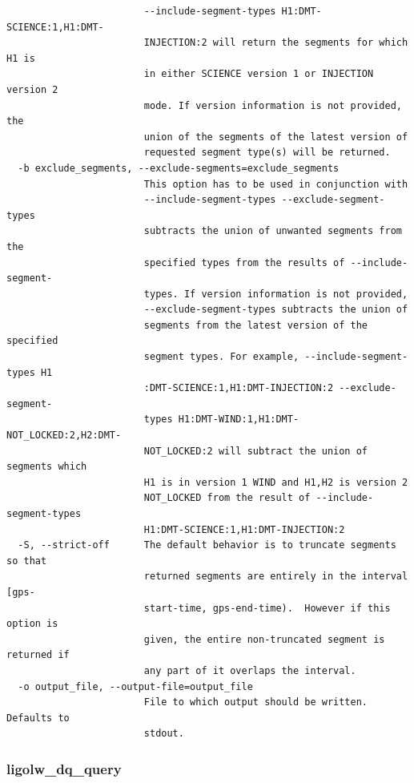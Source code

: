 {\begin{verbatim}
                        --include-segment-types H1:DMT-SCIENCE:1,H1:DMT-
                        INJECTION:2 will return the segments for which H1 is
                        in either SCIENCE version 1 or INJECTION version 2
                        mode. If version information is not provided, the
                        union of the segments of the latest version of
                        requested segment type(s) will be returned.
  -b exclude_segments, --exclude-segments=exclude_segments
                        This option has to be used in conjunction with
                        --include-segment-types --exclude-segment-types
                        subtracts the union of unwanted segments from the
                        specified types from the results of --include-segment-
                        types. If version information is not provided,
                        --exclude-segment-types subtracts the union of
                        segments from the latest version of the specified
                        segment types. For example, --include-segment-types H1
                        :DMT-SCIENCE:1,H1:DMT-INJECTION:2 --exclude-segment-
                        types H1:DMT-WIND:1,H1:DMT-NOT_LOCKED:2,H2:DMT-
                        NOT_LOCKED:2 will subtract the union of segments which
                        H1 is in version 1 WIND and H1,H2 is version 2
                        NOT_LOCKED from the result of --include-segment-types
                        H1:DMT-SCIENCE:1,H1:DMT-INJECTION:2
  -S, --strict-off      The default behavior is to truncate segments so that
                        returned segments are entirely in the interval [gps-
                        start-time, gps-end-time).  However if this option is
                        given, the entire non-truncated segment is returned if
                        any part of it overlaps the interval.
  -o output_file, --output-file=output_file
                        File to which output should be written.  Defaults to
                        stdout.
\end{verbatim}
}

\subsubsection{ligolw\_dq\_query}

